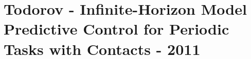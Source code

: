 \section{Todorov - Infinite-Horizon Model Predictive Control for Periodic Tasks with Contacts - 2011}